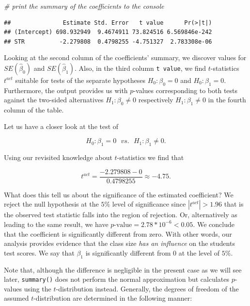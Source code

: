 \documentclass[]{book}
\newenvironment{Shaded}{\begin{snugshade}}{\end{snugshade}}
\newcommand{\CommentTok}[1]{\textcolor[rgb]{0.56,0.35,0.01}{\textit{#1}}}
\theoremstyle{definition}
\theoremstyle{definition}
\theoremstyle{definition}
\theoremstyle{remark}
\begin{document}
\begin{Shaded}
\begin{Highlighting}[]
\CommentTok{# print the summary of the coefficients to the console}
\end{Highlighting}
\end{Shaded}

\begin{verbatim}
##               Estimate Std. Error   t value      Pr(>|t|)
## (Intercept) 698.932949  9.4674911 73.824516 6.569846e-242
## STR          -2.279808  0.4798255 -4.751327  2.783308e-06
\end{verbatim}

Looking at the second column of the coefficients' summary, we discover
values for \(SE(\hat\beta_0)\) and \(SE(\hat\beta_1)\). Also, in the
third column \texttt{t value}, we find \(t\)-statistics \(t^{act}\)
suitable for tests of the separate hypotheses \(H_0: \beta_0=0\) and
\(H_0: \beta_1=0\). Furthermore, the output provides us with
\(p\)-values corresponding to both tests against the two-sided
alternatives \(H_1:\beta_0\neq0\) respectively \(H_1:\beta_1\neq0\) in
the fourth column of the table.

Let us have a closer look at the test of

\[H_0: \beta_1=0 \ \ \ vs. \ \ \ H_1: \beta_1 \neq 0.\]

Using our revisited knowledge about \(t\)-statistics we find that

\[ t^{act} = \frac{-2.279808 - 0}{0.4798255} \approx - 4.75. \]

What does this tell us about the significance of the estimated
coefficient? We reject the null hypothesis at the \(5\%\) level of
significance since \(|t^{act}| > 1.96\) that is the observed test
statistic falls into the region of rejection. Or, alternatively as
leading to the same result, we have
\(p\text{-value} = 2.78*10^{-6} < 0.05\). We conclude that the
coefficient is significantly different from zero. With other words, our
analysis provides evidence that the class size \emph{has an influence}
on the students test scores. We say that \(\beta_1\) is significantly
different from \(0\) at the level of \(5\%\).

Note that, although the difference is negligible in the present case as
we will see later, \texttt{summary()} does not perform the normal
approximation but calculates \(p\)-values using the \(t\)-distribution
instead. Generally, the degrees of freedom of the assumed
\(t\)-distribution are determined in the following manner:
\end{document}
